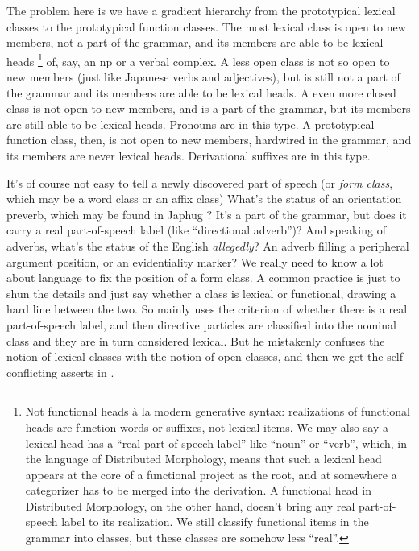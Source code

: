\documentclass[UTF8, a4paper, oneside, scheme=plain]{ctexrep}
\newcommand*{\citesec}[1]{\S~{#1}}
\newcommand*{\term}[1]{\emph{#1}}
\newcommand{\corpus}[1]{\emph{#1}}
\newcommand{\ala}{à la}
\begin{document}
The problem here is we have a gradient hierarchy 
from the prototypical lexical classes 
to the prototypical function classes.
The most lexical class is open to new members, 
not a part of the grammar,
and its members are able to be lexical heads%
\footnote{
    Not functional heads \ala{} modern generative syntax:
    realizations of functional heads are function words or suffixes, 
    not lexical items.
    We may also say a lexical head has a ``real part-of-speech label'' 
    like ``noun'' or ``verb'',
    which, in the language of Distributed Morphology, means that 
    such a lexical head appears at the core of a functional project as the root,
    and at somewhere a categorizer has to be merged into the derivation.
    A functional head in Distributed Morphology, on the other hand, 
    doesn't bring any real part-of-speech label to its realization.
    We still classify functional items in the grammar into classes,
    but these classes are somehow less ``real''.
}   
of, say, an \acs{np} or a verbal complex.
A less open class is not so open to new members 
(just like Japanese verbs and adjectives),
but is still not a part of the grammar 
and its members are able to be lexical heads. 
A even more closed class is not open to new members,
and is a part of the grammar,
but its members are still able to be lexical heads.
Pronouns are in this type.
A prototypical function class, then, 
is not open to new members, hardwired in the grammar, 
and its members are never lexical heads.
Derivational suffixes are in this type.

It's of course not easy to tell a newly discovered part of speech 
(or \term{form class}, which may be a word class or an affix class)
What's the status of an orientation preverb, 
which may be found in Japhug \citep{jacques2021grammar}?
It's a part of the grammar,
but does it carry a real part-of-speech label (like ``directional adverb'')?
And speaking of adverbs, what's the status of the English \corpus{allegedly}?
An adverb filling a peripheral argument position,
or an evidentiality marker?
We really need to know a lot about language to fix the position of a form class.
A common practice is just to shun the details and just say whether a class is lexical or functional,
drawing a hard line between the two.
So \citet{zhudexigrammar} mainly uses the criterion of whether there is a real part-of-speech label,
and then directive particles are classified into the nominal class 
and they are in turn considered lexical.
But he mistakenly confuses the notion of lexical classes with the notion of open classes,
and then we get the self-conflicting asserts in \citet[\citesec{3.4}]{zhudexigrammar}.
\end{document}
